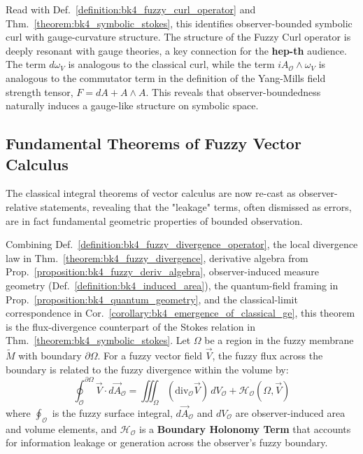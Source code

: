 \begin{scholium}
\label{scholium:bk4_gauge_relation}
Read with Def.~\ref{definition:bk4_fuzzy_curl_operator} and Thm.~\ref{theorem:bk4_symbolic_stokes}, this identifies observer-bounded symbolic curl with gauge-curvature structure.
The structure of the Fuzzy Curl operator is deeply resonant with gauge theories, a key connection for the \textbf{hep-th} audience. The term $d\omega_V$ is analogous to the classical curl, while the term $i A_{\mathcal{O}} \wedge \omega_V$ is analogous to the commutator term in the definition of the Yang-Mills field strength tensor, $F = dA + A \wedge A$. This reveals that observer-boundedness naturally induces a gauge-like structure on symbolic space.
\end{scholium}

\subsection{Fundamental Theorems of Fuzzy Vector Calculus}
\label{subsec:bk4_fuzzy_vector_calculus_theorems}

The classical integral theorems of vector calculus are now re-cast as observer-relative statements, revealing that the "leakage" terms, often dismissed as errors, are in fact fundamental geometric properties of bounded observation.

\begin{theorem}
\label{theorem:bk4_fuzzy_divergence_theorem}
Combining Def.~\ref{definition:bk4_fuzzy_divergence_operator}, the local divergence law in Thm.~\ref{theorem:bk4_fuzzy_divergence}, derivative algebra from Prop.~\ref{proposition:bk4_fuzzy_deriv_algebra}, observer-induced measure geometry (Def.~\ref{definition:bk4_induced_area}), the quantum-field framing in Prop.~\ref{proposition:bk4_quantum_geometry}, and the classical-limit correspondence in Cor.~\ref{corollary:bk4_emergence_of_classical_ge}, this theorem is the flux-divergence counterpart of the Stokes relation in Thm.~\ref{theorem:bk4_symbolic_stokes}.
Let $\Omega$ be a region in the fuzzy membrane $\tilde{M}$ with boundary $\partial\Omega$. For a fuzzy vector field $\vec{V}$, the fuzzy flux across the boundary is related to the fuzzy divergence within the volume by:
\[
\oint_{\mathcal{O}}^{\partial\Omega} \vec{V} \cdot d\vec{A}_{\mathcal{O}} = \iiint_{\Omega} (\text{div}_{\mathcal{O}} \vec{V}) \, dV_{\mathcal{O}} + \mathcal{H}_{\mathcal{O}}(\Omega, \vec{V})
\]
where $\oint_{\mathcal{O}}$ is the fuzzy surface integral, $d\vec{A}_{\mathcal{O}}$ and $dV_{\mathcal{O}}$ are observer-induced area and volume elements, and $\mathcal{H}_{\mathcal{O}}$ is a \textbf{Boundary Holonomy Term} that accounts for information leakage or generation across the observer's fuzzy boundary.
\end{theorem}

